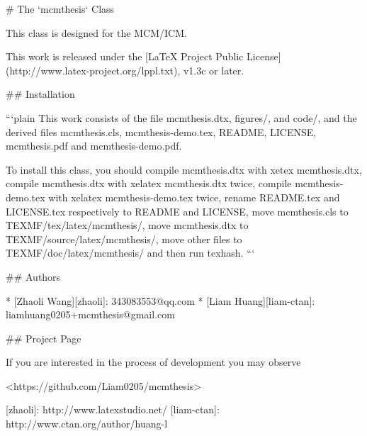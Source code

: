 # The `mcmthesis` Class

This class is designed for the MCM/ICM.

This work is released under the [LaTeX Project Public
License](http://www.latex-project.org/lppl.txt), v1.3c or later.

## Installation

```plain
This work consists of the file mcmthesis.dtx,
                               figures/, and
                               code/,
and the derived files          mcmthesis.cls,
                               mcmthesis-demo.tex,
                               README,
                               LICENSE,
                               mcmthesis.pdf and
                               mcmthesis-demo.pdf.

To install this class, you should
    compile mcmthesis.dtx      with xetex mcmthesis.dtx,
    compile mcmthesis.dtx      with xelatex mcmthesis.dtx twice,
    compile mcmthesis-demo.tex with xelatex mcmthesis-demo.tex twice,
    rename README.tex and LICENSE.tex respectively to README and LICENSE,
    move mcmthesis.cls         to TEXMF/tex/latex/mcmthesis/,
    move mcmthesis.dtx         to TEXMF/source/latex/mcmthesis/,
    move other files           to TEXMF/doc/latex/mcmthesis/ and then
    run texhash.
```

## Authors

* [Zhaoli Wang][zhaoli]: 343083553@qq.com
* [Liam Huang][liam-ctan]: liamhuang0205+mcmthesis@gmail.com

## Project Page

If you are interested in the process of development you may observe

<https://github.com/Liam0205/mcmthesis>

[zhaoli]: http://www.latexstudio.net/
[liam-ctan]: http://www.ctan.org/author/huang-l
